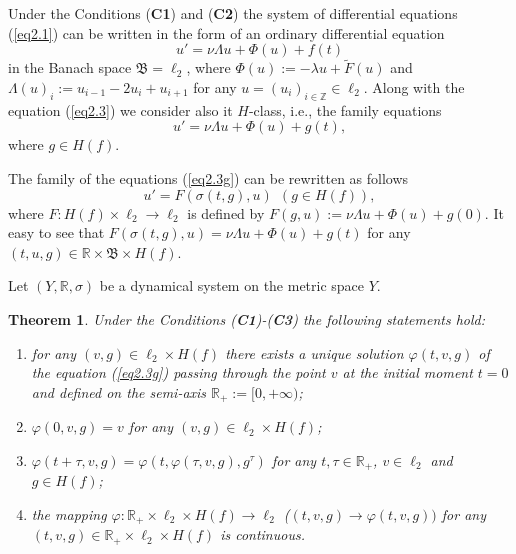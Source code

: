 \documentclass{amsart}%
\newtheorem{theorem}[lemma]{Theorem}
\begin{document}
Under the Conditions (\textbf{C1}) and (\textbf{C2}) the system of
differential equations (\ref{eq2.1}) can be written in the form of
an ordinary differential equation
\begin{equation}\label{eq2.3}
u'=\nu \Lambda u +\Phi (u)+f(t)
\end{equation}
in the Banach space $\mathfrak B=\ell_{2}$, where
$\Phi(u):=-\lambda u +\widetilde{F} (u)$ and
$\Lambda(u)_{i}:=u_{i-1}-2u_{i}+u_{i+1}$ for any $u=(u_i)_{i\in
\mathbb Z}\in \ell_{2}$. Along with the equation (\ref{eq2.3}) we
consider also it $H$-class, i.e., the family equations
\begin{equation}\label{eq2.3g}
u'=\nu \Lambda u +\Phi (u)+g(t),
\end{equation}
where $g\in H(f)$.

The family of the equations (\ref{eq2.3g}) can be rewritten as
follows
\begin{equation}\label{eq2.3H}
u'=F(\sigma(t,g),u)\ \ (g\in H(f)),
\end{equation}
where $F:H(f)\times \ell_{2}\to \ell_{2}$ is defined by
$F(g,u):=\nu \Lambda u+\Phi (u) +g(0)$. It easy to see that
$F(\sigma(t,g),u)=\nu \Lambda u+\Phi (u)+g(t)$ for any $(t,u,g)\in
\mathbb R\times \mathfrak B \times H(f)$.

Let $(Y,\mathbb R,\sigma)$ be a dynamical system on the metric
space $Y$.

\begin{theorem}\label{thAP1} \cite{CS_2025} Under the Conditions (\textbf{C1})-(\textbf{C3}) the following statements hold:
\begin{enumerate}
    \item for any $(v,g)\in \ell_{2}\times H(f)$ there exists a unique
    solution $\varphi(t,v,g)$ of the equation (\ref{eq2.3g}) passing
    through the point $v$ at the initial moment $t=0$ and defined on
    the semi-axis $\mathbb R_{+}:=[0,+\infty)$; \item
    $\varphi(0,v,g)=v$ for any $(v,g)\in \ell_{2}\times H(f)$; \item
    $\varphi(t+\tau,v,g)=\varphi(t,\varphi(\tau,v,g),g^{\tau})$ for
    any $t,\tau\in \mathbb R_{+}$, $v\in \ell_{2}$ and $g\in H(f)$;
     \item the mapping
    $\varphi :\mathbb R_{+}\times \ell_{2}\times H(f)\to \ell_{2}$
    ($(t,v,g)\to \varphi(t,v,g))$ for any $(t,v,g)\in \mathbb
    R_{+}\times \ell_{2}\times H(f)$ is continuous.
\end{enumerate}
\end{theorem}
\end{document}
